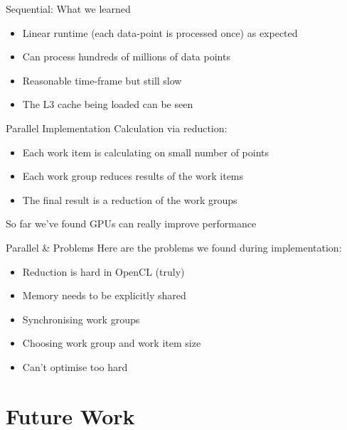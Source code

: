 \documentclass[10pt,aspectratio=169]{beamer} %
\begin{document}
\begin{frame}{Sequential: What we learned}
\begin{itemize}[<+- | alert@+>]
\item Linear runtime (each data-point is processed once) as expected
\item Can process hundreds of millions of data points
\item Reasonable time-frame but still slow
\item The L3 cache being loaded can be seen
\end{itemize}
\end{frame}

\begin{frame}{Parallel Implementation}
Calculation via reduction:
\begin{itemize}
\item Each work item is calculating on small number of points
\item Each work group reduces results of the work items
\item The final result is a reduction of the work groups
\end{itemize}
So far we've found GPUs can really improve performance
\end{frame}

\begin{frame}{Parallel \& Problems}
Here are the problems we found during implementation:
\begin{itemize}[<+- | alert@+>]
\item Reduction is hard in OpenCL (truly)
\item Memory needs to be explicitly shared
\item Synchronising work groups
\item Choosing work group and work item size
\item Can't optimise too hard
\end{itemize} 
\end{frame}


\section{Future Work}
\end{document}
